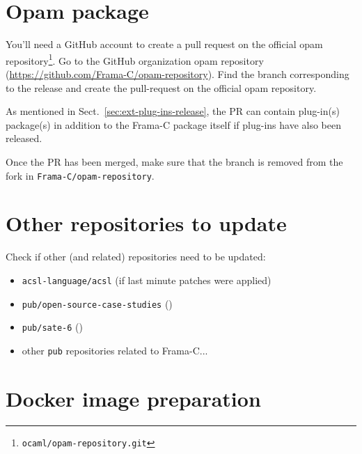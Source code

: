 \section{Opam package}
\label{sec:opam-package}

You'll need a GitHub account to create a pull request on the official opam
repository\footnote{\texttt{ocaml/opam-repository.git}}. Go to the \FramaC
GitHub organization opam repository (\url{https://github.com/Frama-C/opam-repository}).
Find the branch corresponding to the release and create the pull-request on the
official opam repository.

As mentioned in Sect.~\ref{sec:ext-plug-ins-release}, the PR can contain
plug-in(s) package(s) in addition to the Frama-C package itself if plug-ins
have also been released.

Once the PR has been merged, make sure that the branch is removed from
the fork in
\texttt{Frama-C/opam-repository}.

\section{Other repositories to update}
\label{sec:other-repos-update}

Check if other \FramaC (and related) repositories need to be updated:

\begin{itemize}
\item \texttt{acsl-language/acsl} (if last minute patches were applied)
\item \texttt{pub/open-source-case-studies} ()
\item \texttt{pub/sate-6} ()
\item other \texttt{pub} repositories related to Frama-C...
\end{itemize}

\section{Docker image preparation}
\label{sec:dock-image-prep}


